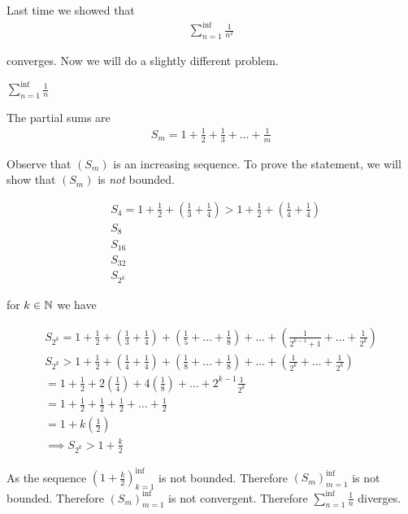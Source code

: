
Last time we showed that 
\begin{align}
	\sum_{n=1}^{\inf } \frac{1}{n^{2}}
\end{align}

converges. Now we will do a slightly different problem.

\begin{eg}
	$\sum_{n=1}^{\inf } \frac{1}{n}$
\end{eg}

The partial sums are 
\begin{align}
	S_m = 1 + \frac{1}{2} + \frac{1}{3} + \ldots + \frac{1}{m}
\end{align}

Observe that $\left( S_m \right) $ is an increasing sequence. To prove the statement, we will show that $\left( S_m \right) $ is \textit{not} bounded.

\begin{align}
	&S_4 = 1 + \frac{1}{2} + \left( \frac{1}{3} + \frac{1}{4} \right) > 1 + \frac{1}{2} + \left( \frac{1}{4} + \frac{1}{4}\right) \\
	&S_8\\
	&S_{16}\\
	&S_{32}\\
	&S_{2^{k}}
\end{align}

for $k \in \mathbb{N}$ we have

\begin{align}
	S_{2^{k}} = 1 + \frac{1}{2} + \left( \frac{1}{3} + \frac{1}{4} \right) + \left( \frac{1}{5} + \ldots + \frac{1}{8} \right)  + \ldots + \left( \frac{1}{2^{k-1} + 1} + \ldots + \frac{1}{2^{k}} \right) \\
	S_{2^{k}} > 1 + \frac{1}{2} + \left( \frac{1}{4} + \frac{1}{4} \right) + \left( \frac{1}{8} + \ldots + \frac{1}{8} \right) + \ldots + \left( \frac{1}{2^{k}} + \ldots + \frac{1}{2^{k}} \right)  \\
	= 1 + \frac{1}{2} + 2\left( \frac{1}{4} \right) + 4 \left( \frac{1}{8} \right) + \ldots + 2^{k-1} \frac{1}{2^{k}} \\
	= 1 + \frac{1}{2} + \frac{1}{2} + \frac{1}{2} + \ldots + \frac{1}{2} \\
	= 1 + k\left( \frac{1}{2} \right) \\
	\implies S_{2^{k}} > 1 + \frac{k}{2}
\end{align}

As the sequence $\left( 1 + \frac{k}{2} \right)_{k=1}^{\inf }$ is not bounded. Therefore $\left( S_m \right)_{m=1}^{\inf }$ is not bounded. Therefore $\left( S_m \right)_{m=1}^{\inf }$ is not convergent. Therefore $\sum_{n=1}^{\inf } \frac{1}{n}$ diverges.


